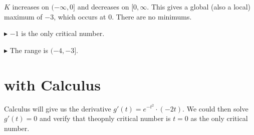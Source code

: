 \documentclass{ximera}
\begin{document}
$K$ increases on $(-\infty, 0]$ and decreases on $[0, \infty$.  This gives a global (also a local) maximum of $-3$, which occurs at $0$.   There are no minimums.


$\blacktriangleright$  $-1$ is the only critical number.


$\blacktriangleright$  The range is $(-4, -3]$.

















\section{with Calculus}

Calculus will give us the derivative $g'(t) = e^{-t^2} \cdot (-2t)$.  We could then solve $g'(t) = 0$ and verify that theopnly critical number is $t = 0$ as the only critical number.
\end{document}
